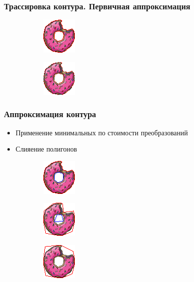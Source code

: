 \documentclass[10pt, unicode]{beamer}
\begin{document}
    \begin{frame}
        \frametitle{Трассировка контура. Первичная аппроксимация}
        \begin{figure}[H]
            \centering
            \begin{subfigure}[l]{0.50\linewidth}
                \centering
                \includegraphics[scale=2]{donutpixel_contour_none.png}
            \end{subfigure}
            \begin{subfigure}{0.49\linewidth}
                \centering
                \includegraphics[scale=2]{donutpixel_contour_simple.png}
            \end{subfigure}
        \end{figure}
    \end{frame}
    \begin{frame}
        \frametitle{Аппроксимация контура}
        \begin{itemize}
            \item Применение минимальных по стоимости преобразований
            \item Слияение полигонов
        \end{itemize}
        \begin{figure}[H]
            \centering
            \begin{subfigure}[l]{0.33\linewidth}
                \centering
                \includegraphics[scale=1.5]{donutpixel_approx_start.png}
            \end{subfigure}
            \begin{subfigure}{0.33\linewidth}
                \centering
                \includegraphics[scale=1.5]{donutpixel_approx_mid.png}
            \end{subfigure}\begin{subfigure}{0.33\linewidth}
                \centering
                \includegraphics[scale=1.5]{donutpixel_approx_end.png}
            \end{subfigure}
        \end{figure}
    \end{frame}
\end{document}
